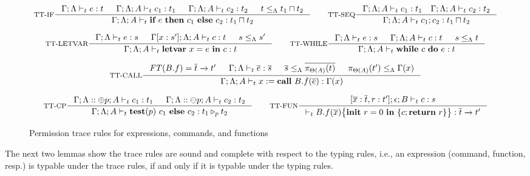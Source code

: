 {{{\begin{figure*}[t]
\begin{tiny}
\[
\inference[TT-IF]
{
\Gamma;\trace \vdash_{t} e : t &
\Gamma;\trace; A \vdash_{t} c_1 : t_1 &
\Gamma;\trace; A \vdash_{t} c_2 : t_2 &
t \leq_{\trace} t_1\sqcap t_2
}
{\Gamma;\trace;  A \vdash_{t} \lcIF{e}{c_1}{c_2} : t_1\sqcap t_2}
\qquad
\inference[TT-SEQ]
{\Gamma;\trace; A \vdash_{t} c_1 : t_1 \quad \Gamma;\trace; A \vdash_{t} c_2 : t _2}
{\Gamma;\trace; A \vdash_{t} \lcSEQ{c_1}{c_2} : t_1\sqcap t_2}
\]

\[
\inference[TT-LETVAR]
{\Gamma;\trace \vdash_{t} e : s &
\Gamma[x:s']; \trace; A \vdash_{t} c : t & s \leq_{\trace} s' }
{\Gamma;\trace; A\vdash_{t} \lcLETVAR{x}{e}{c} :  t}
\qquad
\inference[TT-WHILE]
{
\Gamma;\trace \vdash_{t} e : s &
\Gamma;\trace; A \vdash_{t} c : t &  s\leq_{\trace} t  }
{\Gamma;\trace; A \vdash_{t} \lcWHILE{c}{e} : t }
\]

\[
\inference[TT-CALL]
{
\FT(B.f) = \overline{t} \xrightarrow{} t'  &
\Gamma;\trace \vdash_{t} \overline{e} : \overline{s} &
\overline{s}\leq_{\trace} \overline{\app{t}{\Theta(A)}} &
\app{t'}{\Theta(A)}\leq_{\trace} \Gamma(x)
}
{\Gamma;\trace; A \vdash_{t} \lcCALL{x}{B.f}{\overline{e}} : \Gamma(x)}
\]

\[
\inference[TT-CP]
{\Gamma;\trace::\tplus{ p}; A \vdash_{t} c_1 : t_1 &
\Gamma;\trace::\tminus{p}; A \vdash_{t} c_2 : t_2}
{\Gamma;\trace; A \vdash_{t} \lcCP{p}{c_1}{c_2} : \omerge{p} {t_1}{t_2}}
\qquad
\inference[TT-FUN]
{
[\overline{ x}: \overline{t},\lpRES:t'];\epsilon; B \vdash_{t} c : s
}
{\vdash_{t} \lpPROG{B.f}{\overline{x}}{c}{\lpRES} :  \overline{t}\xrightarrow{} t'}
\]
\end{tiny}
\caption{Permission trace rules for expressions, commands, and functions} \label{fig:infer-rules}
\end{figure*}

 

The next two lemmas show the trace rules are sound and complete with respect to the typing rules, i.e., an expression (command, function, resp.)  is typable under the trace rules, if and only if it is typable under the typing rules.

}}}

